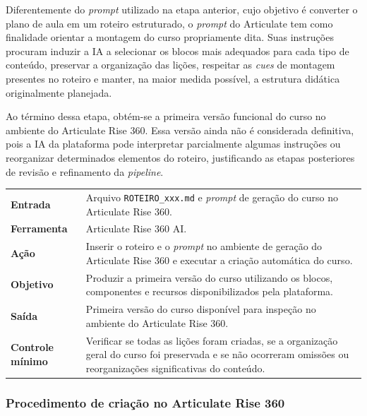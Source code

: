 \documentclass[12pt,a4paper]{article}
\newcommand{\campo}[1]{\textcolor{azulinst}{\textbf{#1}}}
\begin{document}
Diferentemente do \textit{prompt} utilizado na etapa anterior, cujo objetivo é converter o plano de aula em um roteiro estruturado, o \textit{prompt} do Articulate tem como finalidade orientar a montagem do curso propriamente dita. Suas instruções procuram induzir a IA a selecionar os blocos mais adequados para cada tipo de conteúdo, preservar a organização das lições, respeitar as \textit{cues} de montagem presentes no roteiro e manter, na maior medida possível, a estrutura didática originalmente planejada.

Ao término dessa etapa, obtém-se a primeira versão funcional do curso no ambiente do Articulate Rise 360. Essa versão ainda não é considerada definitiva, pois a IA da plataforma pode interpretar parcialmente algumas instruções ou reorganizar determinados elementos do roteiro, justificando as etapas posteriores de revisão e refinamento da \textit{pipeline}.

\begin{longtable}{p{}p{}}
\toprule
\campo{Entrada} &
Arquivo \texttt{ROTEIRO\_xxx.md} e \textit{prompt} de geração do curso no Articulate Rise 360. \\

\campo{Ferramenta} &
Articulate Rise 360 AI. \\

\campo{Ação} &
Inserir o roteiro e o \textit{prompt} no ambiente de geração do Articulate Rise 360 e executar a criação automática do curso. \\

\campo{Objetivo} &
Produzir a primeira versão do curso utilizando os blocos, componentes e recursos disponibilizados pela plataforma. \\

\campo{Saída} &
Primeira versão do curso disponível para inspeção no ambiente do Articulate Rise 360. \\

\campo{Controle mínimo} &
Verificar se todas as lições foram criadas, se a organização geral do curso foi preservada e se não ocorreram omissões ou reorganizações significativas do conteúdo. \\

\bottomrule
\end{longtable}

\subsubsection*{Procedimento de criação no Articulate Rise 360}
\end{document}
